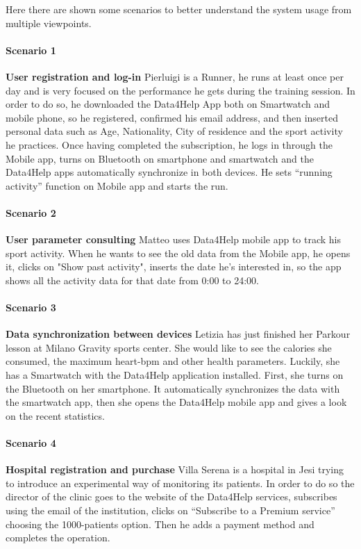 Here there are shown some scenarios to better understand the system usage from multiple viewpoints.

\paragraph{Scenario 1} \textbf{ User registration and log-in} \newline
Pierluigi is a Runner, he runs at least once per day and is very focused on the performance he gets during the training session.
In order to do so, he downloaded the Data4Help App  both on Smartwatch and mobile phone, so he registered, confirmed his email address, and then inserted personal data such as Age, Nationality, City of residence and the sport activity he practices.
Once having completed the subscription, he logs in through the Mobile app, turns on Bluetooth on smartphone and smartwatch and the Data4Help apps automatically synchronize in both devices. He sets “running activity” function on Mobile app and starts the run.



\paragraph{Scenario 2} \textbf{ User parameter consulting} \newline
Matteo uses Data4Help mobile app to track his sport activity. When he wants to see the old data from the Mobile app, he opens it, clicks on "Show past activity", inserts the date he's interested in, so the app shows all the activity data for that date from 0:00 to 24:00.


\paragraph{Scenario 3} \textbf{Data synchronization between devices} \newline
Letizia has just finished her Parkour lesson at Milano Gravity sports center.
She would like to see the calories she consumed, the maximum heart-bpm and other health parameters. Luckily, she has a Smartwatch with the Data4Help application installed. First, she turns on the Bluetooth on her smartphone. It automatically synchronizes the data with the smartwatch app, then she opens the Data4Help mobile app and gives a look on the recent statistics.



\paragraph{Scenario 4} \textbf{Hospital registration and purchase } \newline
Villa Serena is a hospital in Jesi trying to introduce an experimental way of monitoring its patients. In order to do so the director of the clinic goes to the website of the Data4Help services, subscribes using the email of the institution, clicks on “Subscribe to a Premium service” choosing the 1000-patients option. Then he adds a payment method and completes the operation.



